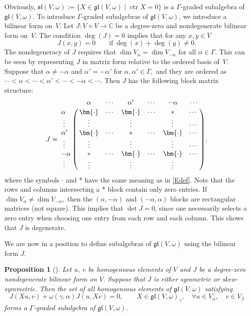 \documentclass[pdftex]{sigma}
\numberwithin{equation}{section}
\newtheorem{Proposition}[Theorem]{Proposition}
\theoremstyle{definition}
\def\gl{\mathfrak{gl}}
\def\sl{\mathfrak{sl}}
\begin{document}
Obviously,
$ \sl(V,\omega) := \{ X \in \gl(V,\omega)\mid \operatorname{ctr} X = 0 \} $
is a $\Gamma$-graded subalgebra of $\gl(V,\omega). $
To introduce $\Gamma$-graded subalgebras of $\gl(V,\omega)$, we introduce a bilinear form on~$V$.
Let $ J\colon V \times V \to \mathbb{C}$ be a degree-zero and nondegenerate bilinear form on~$V$.
The condition $\deg(J) = 0 $ implies that for any $ x, y \in V$
\begin{equation*}
	J(x,y) = 0 \qquad \text{if} \ \deg(x) + \deg(y) \neq 0.
\end{equation*}
The nondegeneracy of $J$ requires that $ \dim V_{\alpha} = \dim V_{-\alpha} $ for all $\alpha \in \Gamma$.
This can be seen by representing $J$ in matrix form relative to the ordered basis of~$V$.
Suppose that $ \alpha \neq -\alpha $ and $ \alpha' = -\alpha'$ for $ \alpha, \alpha' \in \Gamma,$ and they are ordered as $ \cdots < \alpha < \cdots < \alpha' < \cdots < - \alpha < \cdots $.
Then $J$ has the following block matrix structure:
\begin{equation*}
	J =
	\bordermatrix{ & \alpha & \cdots & \alpha' & \cdots& -\alpha & \cdots \cr
		\alpha & \bm{\cdot} & \cdots & \bm{\cdot} & \cdots & \ast & \cdots \cr
		\; \vdots & \vdots & & \vdots & & \vdots & \cdots \cr
		\alpha' & \bm{\cdot} & \cdots & \ast & \cdots & \bm{\cdot} & \cdots \cr
		\; \vdots & \vdots & & \vdots & & \vdots & \cdots \cr
		-\alpha & \ast & \cdots & \bm{\cdot} & \cdots & \bm{\cdot} & \cdots \cr
		\;\vdots & \vdots & & \vdots & & \vdots &
	},
\end{equation*}
where the symbols $ \bm{\cdot}$ and $\ast$ have the same meaning as in \eqref{Edef}.
Note that the rows and columns intersecting a $\ast$ block contain only zero entries.
If $\dim V_{\alpha} \neq \dim V_{-\alpha},$ then the $(\alpha,-\alpha)$ and $(-\alpha,\alpha)$ blocks are rectangular matrices (not square).
This implies that $\det J = 0$, since one necessarily selects a zero entry when choosing one entry from each row and each column.
This shows that $J$ is degenerate.

We are now in a position to define subalgebras of $\gl(V,\omega)$ using the bilinear form $J.$

\begin{Proposition}[\cite{scheuTen}]\label{Prop:SulAlg}
	Let $ u$, $v$ be homogeneous elements of $V$ and $ J$ be a degree-zero nondegenerate bilinear form on $V.$
	Suppose that $J$ is either symmetric or skew-symmetric.
	Then the set of all homogeneous elements of $\gl(V,\omega)$ satisfying
\begin{equation}
J(Xu,v)+ \omega(\gamma,\alpha) J(u,Xv) = 0, \qquad X \in \gl(V,\omega)_{\gamma},\quad \forall u \in V_{\alpha}, \quad v \in V_{\beta}	\label{SubalgCond}
\end{equation}
	forms a $\Gamma$-graded subalgebra of $\gl(V,\omega)$.
\end{Proposition}
\end{document}
